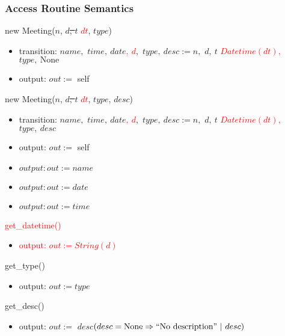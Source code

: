 \documentclass[12pt, titlepage]{article}
\begin{document}
\subsubsection* {Access Routine Semantics}
\noindent new Meeting($n$, \sout{$d$, $t$} \textcolor{red}{$dt$}, $type$)
\begin{itemize}
    \item transition: $name,$ \sout{$time,\ date$}\textcolor{red}{$,\ d$},\ $type,\ desc := n,$ \sout{$d,\ t$} \textcolor{red}{$Datetime(dt),$}\ $type,\ \text{None}$
    \item output: $out :=$ self
\end{itemize}

\noindent new Meeting($n$, \sout{$d$, $t$} \textcolor{red}{$dt$}, $type$, $desc$)
\begin{itemize}
    \item transition: $name,$ \sout{$time,\ date$}\textcolor{red}{$,\ d$},\ $type,\ desc := n,$ \sout{$d,\ t$} \textcolor{red}{$Datetime(dt),$}\ $type,\ desc$
    \item output: $out :=$ self
\end{itemize}

\begin{itemize}
    \item {\sout{$output: out := name$}}
\end{itemize}

\begin{itemize}
    \item {\sout{$output: out := date$}}
\end{itemize}

\begin{itemize}
    \item {\sout{$output: out := time$}}
\end{itemize}

\noindent \textcolor{red}{get\_datetime()}
\begin{itemize}
    \item \textcolor{red}{output: $out := String(d)$}
\end{itemize}

\noindent get\_type()
\begin{itemize}
    \item output: $out := type$
\end{itemize}

\noindent get\_desc()
\begin{itemize}
    \item output: $out :=$ \sout{$desc$}\textcolor{red}{$ (desc = \text{None} \Rightarrow ``\text{No description}"\ |\ desc)$}
\end{itemize}
\end{document}
